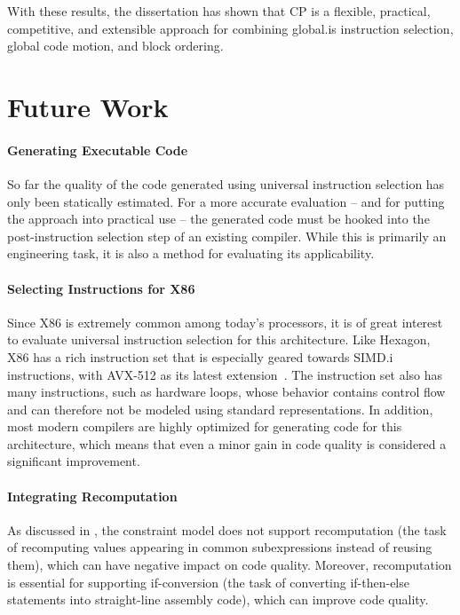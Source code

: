 With these results, the dissertation has shown that \glsdesc{CP} is a flexible,
practical, competitive, and extensible approach for combining \gls{global.is}
\gls{instruction selection}, \gls{global code motion}, and \gls{block ordering}.


\section{Future Work}

\paragraph{Generating Executable Code}

So far the quality of the code generated using \gls{universal instruction
  selection} has only been statically estimated.
%
For a more accurate evaluation -- and for putting the approach into practical
use -- the generated code must be hooked into the post-\gls{instruction
  selection} step of an existing \gls{compiler}.
%
While this is primarily an engineering task, it is also a method for evaluating
its applicability.


\paragraph{Selecting Instructions for X86}

Since \gls{X86} is extremely common among today's processors, it is of great
interest to evaluate \gls{universal instruction selection} for this
architecture.
%
Like \gls{Hexagon}, \gls{X86} has a rich \gls{instruction set} that is
especially geared towards \gls{SIMD.i} \glspl{instruction}, with \gls{AVX}-512
as its latest extension~\cite{Intel64:2015}.
%
The \gls{instruction set} also has many \glspl{instruction}, such as hardware
loops, whose behavior contains control flow and can therefore not be modeled
using standard representations.
%
In addition, most modern \glspl{compiler} are highly optimized for generating
code for this architecture, which means that even a minor gain in code quality
is considered a significant improvement.


\paragraph{Integrating Recomputation}

As discussed in , the \gls{constraint model} does
not support \gls{recomputation} (the task of recomputing values appearing in
common subexpressions instead of reusing them), which can have negative impact
on code quality.
%
Moreover, \gls{recomputation} is essential for supporting \gls{if-conversion}
(the task of converting if-then-else statements into straight-line \gls{assembly
  code}), which can improve code quality.

